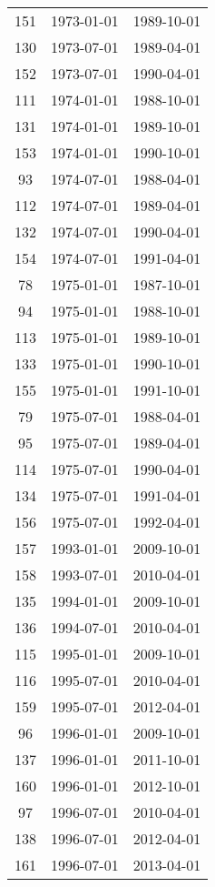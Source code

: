 % 
\begin{tabular}{ccc}
  \hline
  \hline
151 & 1973-01-01 & 1989-10-01 \\ 
  130 & 1973-07-01 & 1989-04-01 \\ 
  152 & 1973-07-01 & 1990-04-01 \\ 
  111 & 1974-01-01 & 1988-10-01 \\ 
  131 & 1974-01-01 & 1989-10-01 \\ 
  153 & 1974-01-01 & 1990-10-01 \\ 
  93 & 1974-07-01 & 1988-04-01 \\ 
  112 & 1974-07-01 & 1989-04-01 \\ 
  132 & 1974-07-01 & 1990-04-01 \\ 
  154 & 1974-07-01 & 1991-04-01 \\ 
  78 & 1975-01-01 & 1987-10-01 \\ 
  94 & 1975-01-01 & 1988-10-01 \\ 
  113 & 1975-01-01 & 1989-10-01 \\ 
  133 & 1975-01-01 & 1990-10-01 \\ 
  155 & 1975-01-01 & 1991-10-01 \\ 
  79 & 1975-07-01 & 1988-04-01 \\ 
  95 & 1975-07-01 & 1989-04-01 \\ 
  114 & 1975-07-01 & 1990-04-01 \\ 
  134 & 1975-07-01 & 1991-04-01 \\ 
  156 & 1975-07-01 & 1992-04-01 \\ 
  157 & 1993-01-01 & 2009-10-01 \\ 
  158 & 1993-07-01 & 2010-04-01 \\ 
  135 & 1994-01-01 & 2009-10-01 \\ 
  136 & 1994-07-01 & 2010-04-01 \\ 
  115 & 1995-01-01 & 2009-10-01 \\ 
  116 & 1995-07-01 & 2010-04-01 \\ 
  159 & 1995-07-01 & 2012-04-01 \\ 
  96 & 1996-01-01 & 2009-10-01 \\ 
  137 & 1996-01-01 & 2011-10-01 \\ 
  160 & 1996-01-01 & 2012-10-01 \\ 
  97 & 1996-07-01 & 2010-04-01 \\ 
  138 & 1996-07-01 & 2012-04-01 \\ 
  161 & 1996-07-01 & 2013-04-01 \\ 

\end{tabular}
